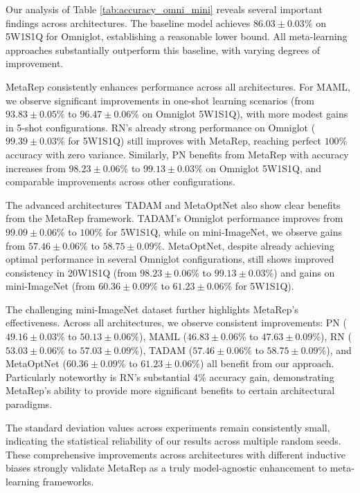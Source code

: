 Our analysis of Table \ref{tab:accuracy_omni_mini} reveals several important findings across architectures. The baseline model achieves $86.03\pm0.03\%$ on 5W1S1Q for Omniglot, establishing a reasonable lower bound. All meta-learning approaches substantially outperform this baseline, with varying degrees of improvement. 

MetaRep consistently enhances performance across all architectures. For MAML, we observe significant improvements in one-shot learning scenarios (from $93.83\pm0.05\%$ to $96.47\pm0.06\%$ on Omniglot 5W1S1Q), with more modest gains in 5-shot configurations. RN's already strong performance on Omniglot ($99.39\pm0.03\%$ for 5W1S1Q) still improves with MetaRep, reaching perfect $100\%$ accuracy with zero variance. Similarly, PN benefits from MetaRep with accuracy increases from $98.23\pm0.06\%$ to $99.13\pm0.03\%$ on Omniglot 5W1S1Q, and comparable improvements across other configurations.

The advanced architectures TADAM and MetaOptNet also show clear benefits from the MetaRep framework. TADAM's Omniglot performance improves from $99.09\pm0.06\%$ to $100\%$ for 5W1S1Q, while on mini-ImageNet, we observe gains from $57.46\pm0.06\%$ to $58.75\pm0.09\%$. MetaOptNet, despite already achieving optimal performance in several Omniglot configurations, still shows improved consistency in 20W1S1Q (from $98.23\pm0.06\%$ to $99.13\pm0.03\%$) and gains on mini-ImageNet (from $60.36\pm0.09\%$ to $61.23\pm0.06\%$ for 5W1S1Q).

The challenging mini-ImageNet dataset further highlights MetaRep's effectiveness. Across all architectures, we observe consistent improvements: PN ($49.16\pm0.03\%$ to $50.13\pm0.06\%$), MAML ($46.83\pm0.06\%$ to $47.63\pm0.09\%$), RN ($53.03\pm0.06\%$ to $57.03\pm0.09\%$), TADAM ($57.46\pm0.06\%$ to $58.75\pm0.09\%$), and MetaOptNet ($60.36\pm0.09\%$ to $61.23\pm0.06\%$) all benefit from our approach. Particularly noteworthy is RN's substantial 4\% accuracy gain, demonstrating MetaRep's ability to provide more significant benefits to certain architectural paradigms.

The standard deviation values across experiments remain consistently small, indicating the statistical reliability of our results across multiple random seeds. These comprehensive improvements across architectures with different inductive biases strongly validate MetaRep as a truly model-agnostic enhancement to meta-learning frameworks.

